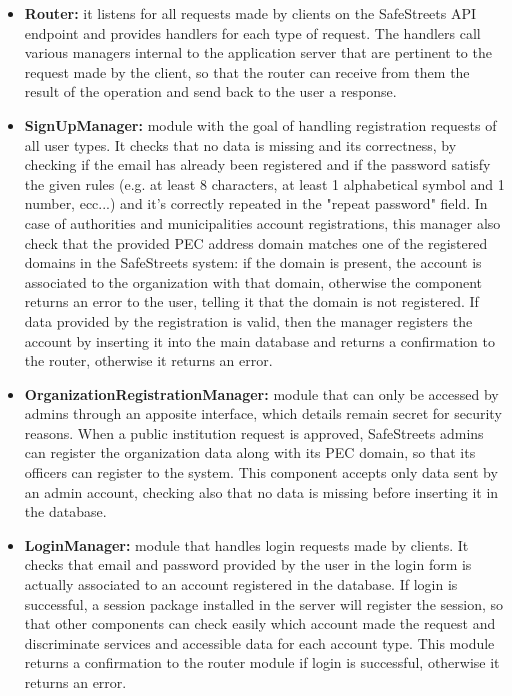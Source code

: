 \begin{itemize}
	\item \textbf{Router:} 
	it listens for all requests made by clients on the SafeStreets API endpoint and provides handlers for each type of request. The handlers call various managers internal to the application server that are pertinent to the request made by the client, so that the router can receive from them the result of the operation and send back to the user a response.
	\item \textbf{SignUpManager:}
	module with the goal of handling registration requests of all user types. It checks that no data is missing and its correctness, by checking if the email has already been registered and if the password satisfy the given rules (e.g. at least 8 characters, at least 1 alphabetical symbol and 1 number, ecc...) and it's correctly repeated in the "repeat password" field. In case of authorities and municipalities account registrations, this manager also check that the provided PEC address domain matches one of the registered domains in the SafeStreets system: if the domain is present, the account is associated to the organization with that domain, otherwise the component returns an error to the user, telling it that the domain is not registered. If data provided by the registration is valid, then the manager registers the account by inserting it into the main database and returns a confirmation to the router, otherwise it returns an error.
	\item \textbf{OrganizationRegistrationManager:}
	module that can only be accessed by admins through an apposite interface, which details remain secret for security reasons. When a public institution request is approved, SafeStreets admins can register the organization data along with its PEC domain, so that its officers can register to the system. This component accepts only data sent by an admin account, checking also that no data is missing before inserting it in the database.
	\item \textbf{LoginManager:}
	module that handles login requests made by clients. It checks that email and password provided by the user in the login form is actually associated to an account registered in the database. If login is successful, a session package installed in the server will register the session, so that other components can check easily which account made the request and discriminate services and accessible data for each account type. This module returns a confirmation to the router module if login is successful, otherwise it returns an error.

\end{itemize}
